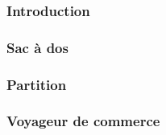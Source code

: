 \subsubsection{Introduction}


\subsubsection{Sac à dos}


\subsubsection{Partition}


\subsubsection{Voyageur de commerce}

